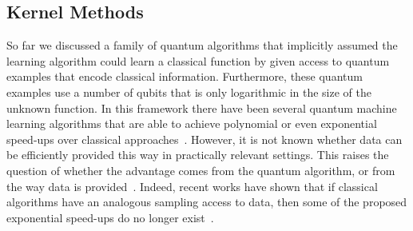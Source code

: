 \documentclass[11pt]{article}
\begin{document}
\subsection{Kernel Methods}
So far we discussed a family of quantum algorithms that implicitly assumed the learning algorithm could learn a classical function by given access to quantum examples that encode classical information. Furthermore, these quantum examples use a number of qubits that is only logarithmic in the size of the unknown function. In this framework there have been several quantum  machine learning algorithms that are able to achieve polynomial or even exponential speed-ups over classical  approaches~\cite{Harrow2009quantum,wiebe2012quantum,lloyd2013quantum,Lloyd2014,Rebentrost2014quantum,lloyd2014quantumtda,Cong_2016,kerenidis2016quantum,Brandao2019sdp,Rebentrost2018svd,Zhao2019quantum}. However, it is not known whether data can be efficiently provided this way in practically relevant settings. This raises the question of whether the advantage comes from the quantum algorithm, or from the way data is provided~\cite{aaronson2015read}. Indeed, recent works have shown that if classical algorithms have an analogous sampling access to data, then some of the proposed exponential speed-ups do no longer exist~\cite{Tang2019quantuminspired,tang2018quantuminspired,gilyn2018quantuminspired,chia2018quantuminspired,ding2019quantuminspired,Chia2020samplingbased}. 
\end{document}
